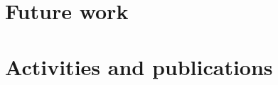\documentclass[]{usiinfprospectus}
\begin{document}
\section{Future work} \label{sec:futurework}

\section{Activities and publications} \label{sec:achievements}



\end{document}
